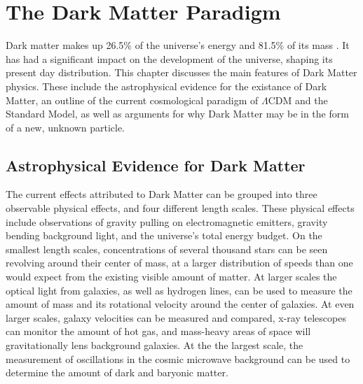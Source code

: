 \cleartooddpage[\thispagestyle{empty}]
\chapter{The Dark Matter Paradigm}

  Dark matter makes up 26.5\% of the universe's energy and 81.5\% of its mass \cite{planck2015}.
  It has had a significant impact on the development of the universe, shaping its present day distribution.
  This chapter discusses the main features of Dark Matter physics.
  These include the astrophysical evidence for the existance of Dark Matter, an outline of the current cosmological paradigm of $\Lambda$CDM and the Standard Model, as well as arguments for why Dark Matter may be in the form of a new, unknown particle.


\section{Astrophysical Evidence for Dark Matter}
The current effects attributed to Dark Matter can be grouped into three observable physical effects, and four different length scales.
These physical effects include observations of gravity pulling on electromagnetic emitters, gravity bending background light, and the universe's total energy budget.
On the smallest length scales, concentrations of several thousand stars can be seen revolving around their center of mass, at a larger distribution of speeds than one would expect from the existing visible amount of matter.
At larger scales the optical light from galaxies, as well as hydrogen lines, can be used to measure the amount of mass and its rotational velocity around the center of galaxies.
At even larger scales, galaxy velocities can be measured and compared, x-ray telescopes can monitor the amount of hot gas, and mass-heavy areas of space will gravitationally lens background galaxies.
At the the largest scale, the measurement of oscillations in the cosmic microwave background can be used to determine the amount of dark and baryonic matter.
  
